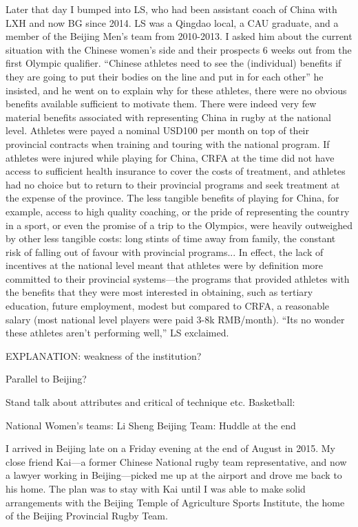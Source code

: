 Later that day I bumped into LS, who had been assistant coach of China with LXH and now BG since 2014.  LS was a Qingdao local, a CAU graduate, and a member of the Beijing Men's team from 2010-2013.  I asked him about the current situation with the Chinese women's side and their prospects 6 weeks out from the first Olympic qualifier.  ``Chinese athletes need to see the (individual) benefits if they are going to put their bodies on the line and put in for each other'' he insisted, and he went on to explain why for these athletes, there were no obvious benefits available sufficient to motivate them.  There were indeed very few material benefits associated with representing China in rugby at the national level.  Athletes were payed a nominal USD100 per month on top of their provincial contracts when training and touring with the national program.  If athletes were injured while playing for China, CRFA at the time did not have access to sufficient health insurance to cover the costs of treatment, and athletes had no choice but to return to their provincial programs and seek treatment at the expense of the province.  The less tangible benefits of playing for China, for example, access to high quality coaching, or the pride of representing the country in a sport, or even the promise of a trip to the Olympics, were heavily outweighed by other less tangible costs: long stints of time away from family, the constant risk of falling out of favour with provincial programs...  In effect, the lack of incentives at the national level meant that athletes were by definition more committed to their provincial systems---the programs that provided athletes with the benefits that they were most interested in obtaining, such as tertiary education, future employment, modest but compared to CRFA, a reasonable salary (most national level players were paid 3-8k RMB/month). ``Its no wonder these athletes aren't performing well,'' LS exclaimed.

EXPLANATION: weakness of the institution?

Parallel to Beijing?


Stand talk about attributes and critical of technique etc.
Basketball:



National Women's teams: Li Sheng
Beijing Team: Huddle at the end






I arrived in Beijing late on a Friday evening at the end of August in 2015.  My close friend Kai---a former Chinese National rugby team representative, and now a lawyer working in Beijing---picked me up at the airport and drove me back to his home.  The plan was to stay with Kai until I was able to make solid arrangements with the Beijing Temple of Agriculture Sports Institute, the home of the Beijing Provincial Rugby Team.

